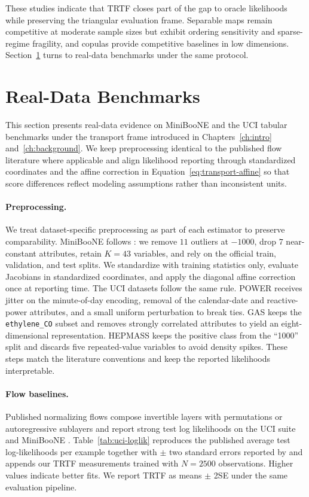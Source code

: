 \documentclass[11pt,a4paper,twoside]{book}\usepackage[]{graphicx}\usepackage[]{xcolor}
\begin{document}
These studies indicate that TRTF closes part of the gap to oracle likelihoods while preserving the triangular evaluation frame. Separable maps remain competitive at moderate sample sizes but exhibit ordering sensitivity and sparse-regime fragility, and copulas provide competitive baselines in low dimensions. Section~\ref{sec:realdata} turns to real-data benchmarks under the same protocol.

\section{Real-Data Benchmarks}\label{sec:realdata}


This section presents real-data evidence on MiniBooNE and the UCI tabular benchmarks under the transport frame introduced in Chapters~\ref{ch:intro} and~\ref{ch:background}. We keep preprocessing identical to the published flow literature where applicable and align likelihood reporting through standardized coordinates and the affine correction in Equation~\eqref{eq:transport-affine} so that score differences reflect modeling assumptions rather than inconsistent units.

\paragraph{Preprocessing.} We treat dataset-specific preprocessing as part of each estimator to preserve comparability. MiniBooNE follows \citet{papamakarios2017masked}: we remove $11$ outliers at $-1000$, drop $7$ near-constant attributes, retain $K=43$ variables, and rely on the official train, validation, and test splits. We standardize with training statistics only, evaluate Jacobians in standardized coordinates, and apply the diagonal affine correction once at reporting time. The UCI datasets follow the same rule. POWER receives jitter on the minute-of-day encoding, removal of the calendar-date and reactive-power attributes, and a small uniform perturbation to break ties. GAS keeps the \texttt{ethylene\_CO} subset and removes strongly correlated attributes to yield an eight-dimensional representation. HEPMASS keeps the positive class from the ``1000'' split and discards five repeated-value variables to avoid density spikes. These steps match the literature conventions and keep the reported likelihoods interpretable.

\paragraph{Flow baselines.} Published normalizing flows compose invertible layers with permutations or autoregressive sublayers and report strong test log likelihoods on the UCI suite and MiniBooNE \citep{rezende2015variational,dinh2017real,kingma2018glow,durkan2019neural,papamakarios2021normalizing}. Table~\ref{tab:uci-loglik} reproduces the published average test log-likelihoods per example together with $\pm$ two standard errors reported by \citet{papamakarios2017masked} and appends our TRTF measurements trained with $N=2500$ observations. Higher values indicate better fits. We report TRTF as means $\pm$ 2SE under the same evaluation pipeline.
\end{document}
